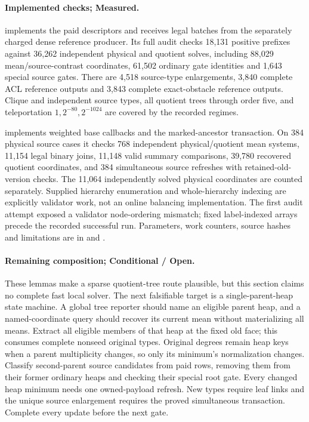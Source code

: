 \paragraph{Implemented checks; Measured.}
 implements the paid descriptors and receives
legal batches from the separately charged dense reference producer. Its
full audit checks 18,131 positive prefixes against 36,262 independent
physical and quotient solves, including 88,029 mean/source-contrast
coordinates, 61,502 ordinary gate identities and 1,643 special source gates.
There are 4,518 source-type enlargements, 3,840 complete ACL reference
outputs and 3,843 complete exact-obstacle reference outputs. Clique and
independent source types, all quotient trees through order five, and
teleportation $1,2^{-80},2^{-1024}$ are covered by the recorded regimes.

 implements weighted base callbacks and
the marked-ancestor transaction. On 384 physical source cases it checks
768 independent physical/quotient mean systems, 11,154 legal binary joins,
11,148 valid summary comparisons, 39,780 recovered quotient coordinates,
and 384 simultaneous source refreshes with retained-old-version checks.
The 11,064 independently solved physical coordinates are counted separately.
Supplied hierarchy enumeration and whole-hierarchy indexing are explicitly
validator work, not an online balancing implementation. The first audit
attempt exposed a validator node-ordering mismatch; fixed label-indexed
arrays precede the recorded successful run. Parameters, work counters,
source hashes and limitations are in
 and
.

\paragraph{Remaining composition; Conditional / Open.}
These lemmas make a sparse quotient-tree route plausible, but this section
claims no complete fast local solver. The next falsifiable target is a
single-parent-heap state machine. A global tree reporter should name an
eligible parent heap, and a named-coordinate query should recover its
current mean without materializing all means. Extract all eligible
members of that heap at the fixed old face; this consumes complete
nonseed original types. Original degrees remain heap keys when a parent
multiplicity changes, so only its minimum's normalization changes.
Classify second-parent source candidates from paid rows, removing them
from their former ordinary heaps and checking their special root gate.
Every changed heap minimum needs one owned-payload refresh. New types
require leaf links and the unique source enlargement requires the proved
simultaneous transaction. Complete every update before the next gate.

